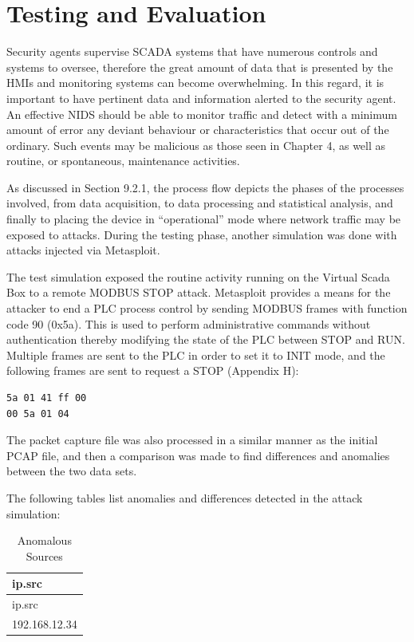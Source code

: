 \documentclass[11pt,a4paper]{article}
\begin{document}
\clearpage

\section{Testing and Evaluation}\label{testing-and-evaluation}

Security agents supervise SCADA systems that have numerous controls and
systems to oversee, therefore the great amount of data that is presented
by the HMIs and monitoring systems can become overwhelming. In this
regard, it is important to have pertinent data and information alerted
to the security agent. An effective NIDS should be able to monitor
traffic and detect with a minimum amount of error any deviant behaviour
or characteristics that occur out of the ordinary. Such events may be
malicious as those seen in Chapter 4, as well as routine, or
spontaneous, maintenance activities.

As discussed in Section 9.2.1, the process flow depicts the phases of
the processes involved, from data acquisition, to data processing and
statistical analysis, and finally to placing the device in
``operational'' mode where network traffic may be exposed to attacks.
During the testing phase, another simulation was done with attacks
injected via Metasploit.

The test simulation exposed the routine activity running on the Virtual
Scada Box to a remote MODBUS STOP attack. Metasploit provides a means
for the attacker to end a PLC process control by sending MODBUS frames
with function code 90 (0x5a). This is used to perform administrative
commands without authentication thereby modifying the state of the PLC
between STOP and RUN. Multiple frames are sent to the PLC in order to
set it to INIT mode, and the following frames are sent to request a STOP
(Appendix H):

\begin{verbatim}
5a 01 41 ff 00
00 5a 01 04
\end{verbatim}

The packet capture file was also processed in a similar manner as the
initial PCAP file, and then a comparison was made to find differences
and anomalies between the two data sets.

The following tables list anomalies and differences detected in the
attack simulation:

\begin{longtable}[c]{@{}l@{}}
\caption{Anomalous Sources}\tabularnewline
\toprule
ip.src\tabularnewline
\midrule
\endfirsthead
\toprule
ip.src\tabularnewline
\midrule
\endhead
192.168.12.34\tabularnewline
\bottomrule
\end{longtable}
\end{document}
